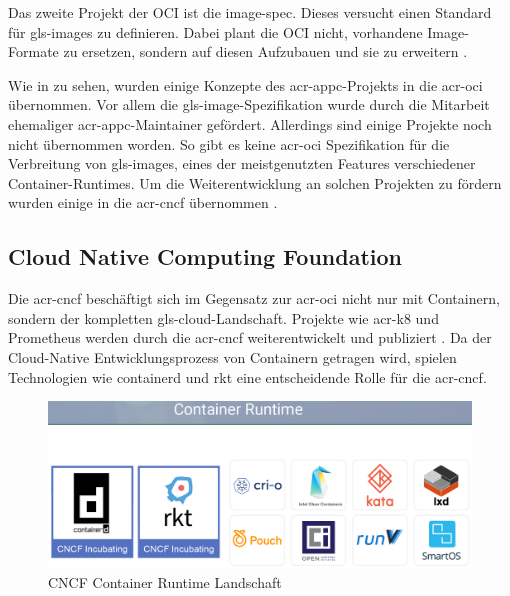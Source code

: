 Das zweite Projekt der OCI ist die image-spec. Dieses versucht einen Standard für \glspl{gls-image} zu definieren. Dabei plant die OCI nicht, vorhandene Image-Formate zu ersetzen, sondern auf diesen Aufzubauen und sie zu erweitern \citep{OpenContainerInitiative}.

Wie in  zu sehen, wurden einige Konzepte des \gls{acr-appc}-Projekts in die \gls{acr-oci} übernommen. Vor allem die \gls{gls-image}-Spezifikation wurde durch die Mitarbeit ehemaliger \gls{acr-appc}-Maintainer gefördert. Allerdings sind einige Projekte noch nicht übernommen worden. So gibt es keine \gls{acr-oci} Spezifikation für die Verbreitung von \glspl{gls-image}, eines der meistgenutzten Features verschiedener Container-Runtimes. Um die Weiterentwicklung an solchen Projekten zu fördern wurden einige in die \gls{acr-cncf} übernommen \citep{MakingSenseofContainerStandardsandFoundations:OCICNCFAppcandRkt}.

\subsection{Cloud Native Computing Foundation}
\label{sec:cncf}
Die \gls{acr-cncf} beschäftigt sich im Gegensatz zur \gls{acr-oci} nicht nur mit Containern, sondern der kompletten \gls{gls-cloud}-Landschaft. Projekte wie \gls{acr-k8} und Prometheus werden durch die \gls{acr-cncf} weiterentwickelt und publiziert \citep{CloudNativeComputingFoundation}. Da der Cloud-Native Entwicklungsprozess von Containern getragen wird, spielen Technologien wie containerd und rkt eine entscheidende Rolle für die \gls{acr-cncf}.

\begin{figure}[h]
	\begin{center}
		\includegraphics[scale=0.3]{bilder/cncf-container-landscape.png}
		\caption{CNCF Container Runtime Landschaft \citep{CNCFCloudNativeInteractiveLandscape}}
		\label{fig:cncfContainerLandscape}
	\end{center}
\end{figure}

